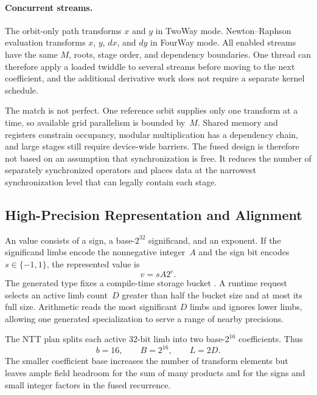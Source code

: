 \paragraph{Concurrent streams.}
The orbit-only path transforms $x$ and $y$ in TwoWay mode.  Newton--Raphson
evaluation transforms $x$, $y$, $dx$, and $dy$ in FourWay mode.  All enabled
streams have the same $M$, roots, stage order, and dependency boundaries.
One thread can therefore apply a loaded twiddle to several streams before
moving to the next coefficient, and the additional derivative work does not
require a separate kernel schedule.

The match is not perfect.  One reference orbit supplies only one transform at
a time, so available grid parallelism is bounded by~$M$.  Shared memory and
registers constrain occupancy, modular multiplication has a dependency chain,
and large stages still require device-wide barriers.  The fused design is
therefore not based on an assumption that synchronization is free.  It reduces
the number of separately synchronized operators and places data at the
narrowest synchronization level that can legally contain each stage.

\subsection{High-Precision Representation and Alignment}
\label{subsec:hpfloat-model}

An  value consists of a sign, a base-$2^{32}$ significand,
and an exponent.  If the significand limbs encode the nonnegative integer~$A$
and the sign bit encodes $s\in\{-1,1\}$, the represented value is
\begin{equation}
  v=sA2^e.
  \label{eq:hp-shark-value}
\end{equation}
The generated type fixes a compile-time storage bucket
.  A runtime request selects an active limb count~$D$
greater than half the bucket size and at most its full size.  Arithmetic reads
the most significant $D$ limbs and ignores lower limbs, allowing one generated
specialization to serve a range of nearby precisions.

The NTT plan splits each active 32-bit limb into two base-$2^{16}$
coefficients.  Thus
\begin{equation}
  b=16,
  \qquad
  B=2^{16},
  \qquad
  L=2D.
  \label{eq:reference-b16-plan}
\end{equation}
The smaller coefficient base increases the number of transform elements but
leaves ample field headroom for the sum of many products and for the signs and
small integer factors in the fused recurrence.

